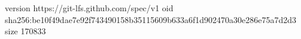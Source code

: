version https://git-lfs.github.com/spec/v1
oid sha256:be10f49dae7e92f743490158b35115609b633a6f1d902470a30e286e75a7d2d3
size 170833
